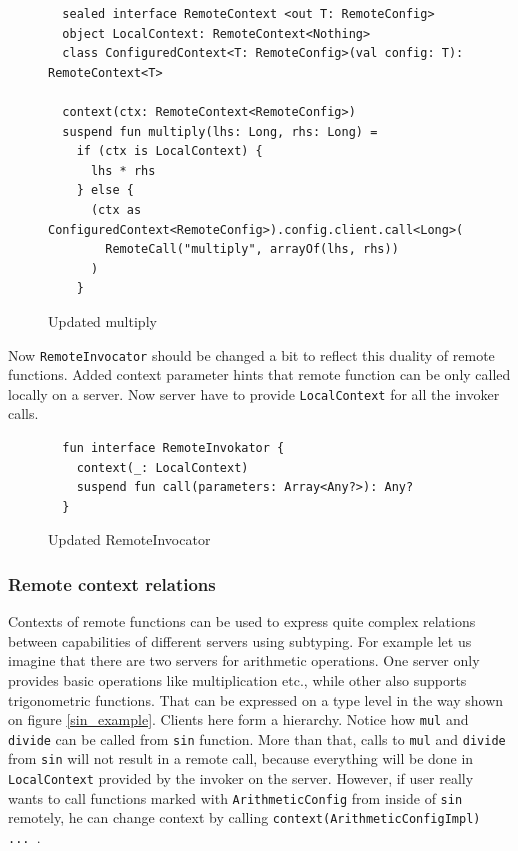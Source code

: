 \documentclass[a4paper,11pt,oneside]{article}
\newcommand{\kotlini}[1]{\texttt{#1}}
\begin{document}
\begin{figure}[!h]
  \begin{verbatim}
  sealed interface RemoteContext <out T: RemoteConfig>
  object LocalContext: RemoteContext<Nothing>
  class ConfiguredContext<T: RemoteConfig>(val config: T): RemoteContext<T>

  context(ctx: RemoteContext<RemoteConfig>)
  suspend fun multiply(lhs: Long, rhs: Long) =
    if (ctx is LocalContext) {
      lhs * rhs
    } else {
      (ctx as ConfiguredContext<RemoteConfig>).config.client.call<Long>(
        RemoteCall("multiply", arrayOf(lhs, rhs))
      )
    }
  \end{verbatim}
  \caption{Updated multiply}\label{dual_multiply}
\end{figure}

Now \kotlini{RemoteInvocator} should be changed a bit to reflect this duality of remote functions.
Added context parameter hints that remote function can be only called locally on a server. Now 
server have to provide \kotlini{LocalContext} for all the invoker calls. 

\begin{figure}[!h]
  \begin{verbatim}
  fun interface RemoteInvokator {
    context(_: LocalContext)
    suspend fun call(parameters: Array<Any?>): Any?
  }
  \end{verbatim}
  \caption{Updated RemoteInvocator}\label{updated_remote_invocator}
\end{figure}

\subsubsection{Remote context relations}

Contexts of remote functions can be used to express quite complex relations between capabilities of
different servers using subtyping. For example let us imagine that there are two servers for
arithmetic operations. One server only provides basic operations like multiplication etc., while
other also supports trigonometric functions. That can be expressed on a type level in the way shown
on figure \ref{sin_example}. Clients here form a hierarchy. Notice how \kotlini{mul} and \kotlini{divide} can be called from
\kotlini{sin} function. More than that, calls to \kotlini{mul} and \kotlini{divide} from
\kotlini{sin} will not result in a remote call, because everything will be done in
\kotlini{LocalContext} provided by the invoker on the server. However, if user really wants to call
functions marked with \kotlini{ArithmeticConfig} from inside of \kotlini{sin} remotely, he can
change context by calling \kotlini{context(ArithmeticConfigImpl) { ... }}.
\end{document}

